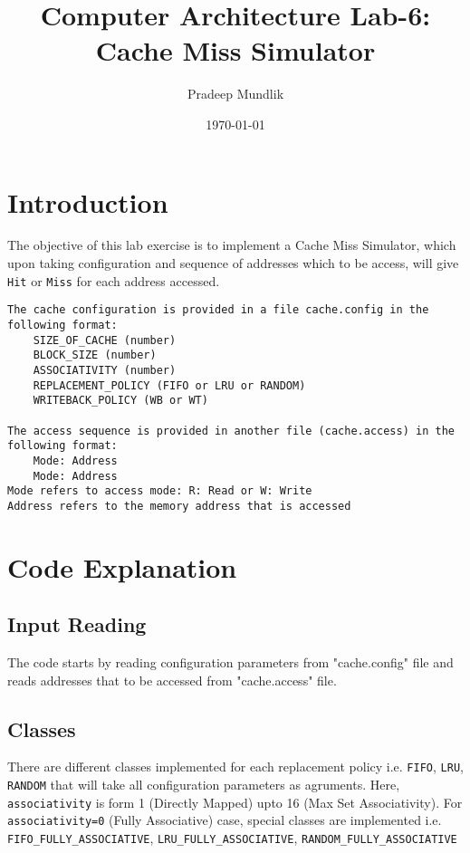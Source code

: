 \documentclass{article}
\title{Computer Architecture Lab-6: Cache Miss Simulator}
\author{Pradeep Mundlik}
\date{\today}
\begin{document}
\maketitle

\section{Introduction}
The objective of this lab exercise is to implement a Cache Miss Simulator, which upon taking configuration and sequence of addresses which to be access, will give \texttt{Hit} or \texttt{Miss} for each address accessed. \\
\begin{verbatim}
The cache configuration is provided in a file cache.config in the following format:
    SIZE_OF_CACHE (number)
    BLOCK_SIZE (number)
    ASSOCIATIVITY (number)
    REPLACEMENT_POLICY (FIFO or LRU or RANDOM)
    WRITEBACK_POLICY (WB or WT)

The access sequence is provided in another file (cache.access) in the following format:
    Mode: Address
    Mode: Address
Mode refers to access mode: R: Read or W: Write
Address refers to the memory address that is accessed
\end{verbatim}

\section{Code Explanation}

\subsection{Input Reading}
The code starts by reading configuration parameters from "cache.config" file and reads addresses that to be accessed from "cache.access" file.  

\subsection{Classes}
There are different classes implemented for each replacement policy i.e. \texttt{FIFO}, \texttt{LRU}, \texttt{RANDOM} that will take all configuration parameters as agruments. Here, \texttt{associativity} is form 1 (Directly Mapped) upto 16 (Max Set Associativity).
For \texttt{associativity=0} (Fully Associative) case, special classes are implemented i.e. \texttt{FIFO\_FULLY\_ASSOCIATIVE},  \texttt{LRU\_FULLY\_ASSOCIATIVE}, \texttt{RANDOM\_FULLY\_ASSOCIATIVE}
\end{document}
